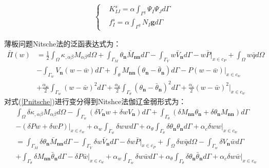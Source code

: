 \begin{equation}
\begin{split}   
    \begin{cases}
   &K^s_{I\!J}=\alpha\int_{\Gamma^g}\Psi_I\Psi_Jd\Gamma\\
   &f^s_I=\alpha\int_{\Gamma^g}N_I\pmb{g}d\Gamma
\end{cases}
\end{split}
\end{equation}\par
薄板问题Nitsche法的泛函表达式为：
\begin{equation}\label{Pnitsche}
\begin{split}
    \bar{\Pi}(w)&=\frac{1}{2}\int_{\Omega}\kappa_{,\alpha\beta}M_{\alpha\beta}d\Omega+\int_{\Gamma_M}\theta_{\pmb{n}}\bar{M}_{\pmb{nn}}d\Gamma-\int_{\Gamma_V}w\bar{V}_{\pmb{n}}d\Gamma-w\bar{P}\vert_{x\in c_P}+\int_{\Omega}w\bar{q}d\Omega\\
&-\int_{\Gamma_w}V_{\pmb{n}}(w-\bar{w})d\Gamma+\int_{\theta}M_{\pmb{nn}}(\theta_{\pmb{n}}-\bar{\theta}_{\pmb{n}})d\Gamma-P(w-\bar{w})\vert_{x\in c_w}\\
&+\frac{\alpha_w}{2}\int_{\Gamma_w}(w-\bar{w})^2d\Gamma+\frac{\alpha_{\theta}}{2}\int_{\Gamma_{\theta}}(\theta_{\pmb{n}}-\bar{\theta}_{\pmb{n}})^2d\Gamma+\frac{\alpha_c}{2}(w-\bar{w})^2\vert_{x\in c_w}
\end{split}
\end{equation}
对式(\ref{Pnitsche})进行变分得到Nitshce法伽辽金弱形式为：
\begin{equation}
\begin{split}
&\int_{\Omega}\delta\kappa_{,\alpha\beta}M_{\alpha\beta}d\Omega-\int_{\Gamma_w}(\delta V_{\pmb{n}}w+\delta wV_{\pmb{n}})d\Gamma+\int_{\Gamma_{\theta}}(\delta M_{\pmb{nn}}\theta_{\pmb{n}}+\delta\theta_{\pmb{n}}M_{\pmb{nn}})d\Gamma\\&-(\delta Pw+\delta wP)\vert_{x\in c_w}
+\alpha_w\int_{\Gamma_w}\delta wwd\Gamma+\alpha_{\theta}\int_{\Gamma_{\theta}}\delta\theta_{\pmb{n}}\theta_{\pmb{n}}d\Gamma+\alpha_c\delta ww\vert_{x\in c_w}\\
&=\int_{\Gamma_M}\delta\theta_{\pmb{n}}\bar{M}_{\pmb{nn}}d\Gamma-\int_{\Gamma_V}\delta w\bar{V}_{\pmb{n}}d\Gamma-\delta w\bar{P}\vert_{x\in c_P}+\int_{\Omega}\delta w\bar{q}d\Omega
-\int_{\Gamma_w}\delta V_{\pmb{n}}\bar{w}d\Gamma\\&+\int_{\Gamma_{\theta}}\delta M_{\pmb{nn}}\bar{\theta}_{\pmb{n}}d\Gamma-\delta P\bar{w}\vert_{x\in c_w}
+\alpha_w\int_{\Gamma_w}\delta w\bar{w}d\Gamma+\alpha_{\theta}\int_{\Gamma_{\theta}}\delta\theta_{\pmb{n}}\bar{\theta}_{\pmb{n}}d\Gamma+\alpha_c\delta w\bar{w}\vert_{x\in c_w}
\end{split}
\end{equation}\par

